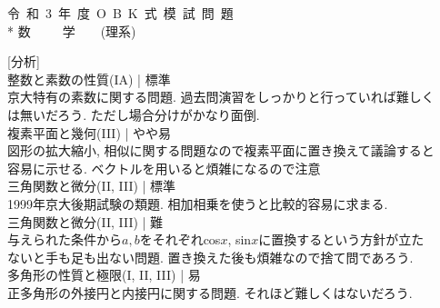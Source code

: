 \documentclass{article}
\begin{document}
\pagestyle{empty} 
\begin{center}
{\LARGE 令\ 和\ 3\ 年\ 度\ O\ B\ K\ 式\ 模\ 試\ 問\ 題 }\vspace{0.5in}\\*
{\huge 数\ \ \ \ \ 学\ \ \ \ (理系)}\vspace{0.3in}\\
\end{center}
{\large[分析]}\vspace{0.1in}\\
    整数と素数の性質(IA) | 標準 \\
  \hspace{0.25in}京大特有の素数に関する問題.  過去問演習をしっかりと行っていれば難しく\\
  \hspace{0.22in}は無いだろう. ただし場合分けがかなり面倒. \vspace{0.2in}\\
    複素平面と幾何(III) | やや易\\
  \hspace{0.22in} 図形の拡大縮小, 相似に関する問題なので複素平面に置き換えて議論すると\\
  \hspace{0.25in}容易に示せる. ベクトルを用いると煩雑になるので注意 \vspace{0.2in}\\
    三角関数と微分(II, III) | 標準 \\
  \hspace{0.22in} 1999年京大後期試験の類題. 相加相乗を使うと比較的容易に求まる.\vspace{0.2in}\\
     三角関数と微分(II, III) | 難 \\
  \hspace{0.22in}与えられた条件から$a, b$をそれぞれcos$x$, sin$x$に置換するという方針が立た\\
  \hspace{0.22in}ないと手も足も出ない問題. 置き換えた後も煩雑なので捨て問であろう.\vspace{0.2in}\\
     多角形の性質と極限(I, II, III) | 易 \\
  \hspace{0.22in} 正多角形の外接円と内接円に関する問題. それほど難しくはないだろう.\vspace{0.2in}\\
\end{document}
